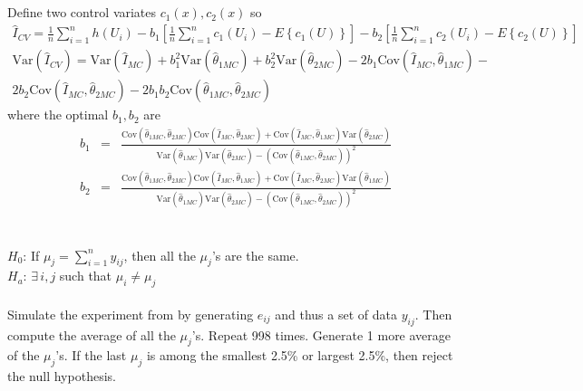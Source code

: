 \documentclass[11pt]{article}
\begin{document}
\subsection{}

Define two control variates $c_1(x),c_2(x)$ so
\begin{eqnarray*}
  \hat{I}_{CV}=\frac{1}{n}\sum_{i=1}^nh\left(U_i\right)-b_1\left[\frac{1}{n}\sum_{i=1}^nc_1\left(U_i\right)-E\left\{c_1\left(U\right)\right\}\right]-b_2\left[\frac{1}{n}\sum_{i=1}^nc_2\left(U_i\right)-E\left\{c_2\left(U\right)\right\}\right]\\
  \textrm{Var}\left(\hat{I}_{CV}\right)=\textrm{Var}\left(\hat{I}_{MC}\right)+b_1^2\textrm{Var}\left(\hat{\theta}_{1MC}\right)+b_2^2\textrm{Var}\left(\hat{\theta}_{2MC}\right)-2b_1\textrm{Cov}\left(\hat{I}_{MC},\hat{\theta}_{1MC}\right)-\\2b_2\textrm{Cov}\left(\hat{I}_{MC},\hat{\theta}_{2MC}\right)-2b_1b_2\textrm{Cov}\left(\hat{\theta}_{1MC},\hat{\theta}_{2MC}\right)\phantom{\textrm{Var}\left(\hat{I}_{MC}\right)}
\end{eqnarray*}
where the optimal $b_1,b_2$ are
\begin{eqnarray*}
  b_1&=&\frac{\textrm{Cov}\left(\hat{\theta}_{1MC},\hat{\theta}_{2MC}\right)\textrm{Cov}\left(\hat{I}_{MC},\hat{\theta}_{2MC}\right)+\textrm{Cov}\left(\hat{I}_{MC},\hat{\theta}_{1MC}\right)\textrm{Var}\left(\hat{\theta}_{2MC}\right)}{\textrm{Var}\left(\hat{\theta}_{1MC}\right)\textrm{Var}\left(\hat{\theta}_{2MC}\right)-\left(\textrm{Cov}\left(\hat{\theta}_{1MC},\hat{\theta}_{2MC}\right)\right)^2}\\
  b_2&=&\frac{\textrm{Cov}\left(\hat{\theta}_{1MC},\hat{\theta}_{2MC}\right)\textrm{Cov}\left(\hat{I}_{MC},\hat{\theta}_{1MC}\right)+\textrm{Cov}\left(\hat{I}_{MC},\hat{\theta}_{2MC}\right)\textrm{Var}\left(\hat{\theta}_{1MC}\right)}{\textrm{Var}\left(\hat{\theta}_{1MC}\right)\textrm{Var}\left(\hat{\theta}_{2MC}\right)-\left(\textrm{Cov}\left(\hat{\theta}_{1MC},\hat{\theta}_{2MC}\right)\right)^2}
\end{eqnarray*}

\section{}

\subsection{}\label{anova}

$H_0$: If $\mu_j=\sum_{i=1}^ny_{ij}$, then all the $\mu_j$'s are the same.\\
$H_a$: $\exists\,i,j $ such that $\mu_i\neq \mu_j$\\
\\
Simulate the experiment from by generating $e_{ij}$ and thus a set of data $y_{ij}$. Then compute the average of all the $\mu_j$'s. Repeat 998 times. Generate 1 more average of the $\mu_j$'s. If the last $\mu_j$ is among the smallest 2.5\% or largest 2.5\%, then reject the null hypothesis.
\end{document}
